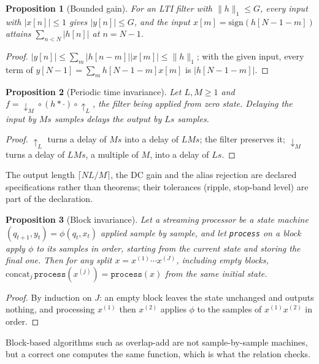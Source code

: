 \documentclass[10pt,conference]{IEEEtran}
\newtheorem{proposition}{Proposition}
\newcommand{\code}[1]{\texttt{#1}}
\begin{document}
\begin{proposition}[Bounded gain] For an LTI filter with $\|h\|_1\le G$,
every input with $|x[n]|\le1$ gives $|y[n]|\le G$, and the input
$x[m]=\mathrm{sign}(h[N-1-m])$ attains $\sum_{n<N}|h[n]|$ at $n=N-1$.\end{proposition}
\begin{proof} $|y[n]|\le\sum_m|h[n-m]||x[m]|\le\|h\|_1$; with the given input,
every term of $y[N-1]=\sum_m h[N-1-m]x[m]$ is $|h[N-1-m]|$.\end{proof}

\begin{proposition}[Periodic time invariance] Let $L,M\ge1$ and
$f=\downarrow_M\circ(h*\cdot)\circ\uparrow_L$, the filter being applied from
zero state. Delaying the input by $Ms$
samples delays the output by $Ls$ samples.\end{proposition}
\begin{proof} $\uparrow_L$ turns a delay of $Ms$ into a delay of $LMs$; the
filter preserves it; $\downarrow_M$ turns a delay of $LMs$, a multiple of $M$,
into a delay of $Ls$.\end{proof}
The output length $\lceil NL/M\rceil$, the DC gain and the alias rejection are
declared specifications rather than theorems; their tolerances (ripple,
stop-band level) are part of the declaration.

\begin{proposition}[Block invariance] Let a streaming processor be a state
machine $(q_{t+1},y_t)=\phi(q_t,x_t)$ applied sample by sample, and let
\code{process} on a block apply $\phi$ to its samples in order, starting from the
current state and storing the final one. Then for any split
$x=x^{(1)}\cdots x^{(J)}$, including empty blocks,
$\mathrm{concat}_j\,\code{process}(x^{(j)})=\code{process}(x)$ from the same
initial state.\end{proposition}
\begin{proof} By induction on $J$: an empty block leaves the state unchanged and
outputs nothing, and processing $x^{(1)}$ then $x^{(2)}$ applies $\phi$ to the
samples of $x^{(1)}x^{(2)}$ in order.\end{proof}
Block-based algorithms such as overlap-add are not sample-by-sample machines,
but a correct one computes the same function, which is what the relation checks.

\end{document}

